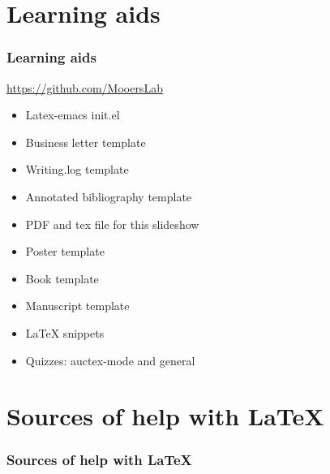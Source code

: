 \documentclass{beamer}
\newcommand{\heart}{\ensuremath\heartsuit}
\begin{document}
\section{Learning aids}
\begin{frame}
\frametitle{Learning aids}
\begin{center}
\begin{Large}
 \url{https://github.com/MooersLab}
\begin{itemize}[font=$\bullet$\scshape\bfseries]
\item Latex-emacs init.el 
\item Business letter template
\item Writing.log template
\item Annotated bibliography template
\item PDF and tex file for this slideshow 
\item Poster template  
\item Book template
\item Manuscript template
\item LaTeX snippets
\item Quizzes: auctex-mode and general
\end{itemize}
\end{Large}
\end{center}
\end{frame}
\note{}


\section{Sources of help with \LaTeX}
\begin{frame}
\frametitle{Sources of help with \LaTeX }
\begin{center}
\begin{Large}
\end{Large}
\end{center}
\end{frame}
\note{}


\end{document}
